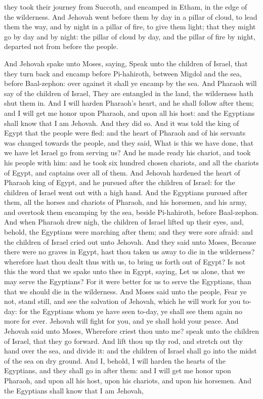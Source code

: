 they took their journey from Succoth, and encamped in Etham, in the edge of the wilderness. And Jehovah went before them by day in a pillar of cloud, to lead them the way, and by night in a pillar of fire, to give them light; that they might go by day and by night: the pillar of cloud by day, and the pillar of fire by night, departed not from before the people. 

And Jehovah spake unto Moses, saying, Speak unto the children of Israel, that they turn back and encamp before Pi-hahiroth, between Migdol and the sea, before Baal-zephon: over against it shall ye encamp by the sea. And Pharaoh will say of the children of Israel, They are entangled in the land, the wilderness hath shut them in. And I will harden Pharaoh’s heart, and he shall follow after them; and I will get me honor upon Pharaoh, and upon all his host: and the Egyptians shall know that I am Jehovah. And they did so. And it was told the king of Egypt that the people were fled: and the heart of Pharaoh and of his servants was changed towards the people, and they said, What is this we have done, that we have let Israel go from serving us? And he made ready his chariot, and took his people with him: and he took six hundred chosen chariots, and all the chariots of Egypt, and captains over all of them. And Jehovah hardened the heart of Pharaoh king of Egypt, and he pursued after the children of Israel: for the children of Israel went out with a high hand. And the Egyptians pursued after them, all the horses and chariots of Pharaoh, and his horsemen, and his army, and overtook them encamping by the sea, beside Pi-hahiroth, before Baal-zephon.  And when Pharaoh drew nigh, the children of Israel lifted up their eyes, and, behold, the Egyptians were marching after them; and they were sore afraid: and the children of Israel cried out unto Jehovah. And they said unto Moses, Because there were no graves in Egypt, hast thou taken us away to die in the wilderness? wherefore hast thou dealt thus with us, to bring us forth out of Egypt? Is not this the word that we spake unto thee in Egypt, saying, Let us alone, that we may serve the Egyptians? For it were better for us to serve the Egyptians, than that we should die in the wilderness. And Moses said unto the people, Fear ye not, stand still, and see the salvation of Jehovah, which he will work for you to-day: for the Egyptians whom ye have seen to-day, ye shall see them again no more for ever. Jehovah will fight for you, and ye shall hold your peace.  And Jehovah said unto Moses, Wherefore criest thou unto me? speak unto the children of Israel, that they go forward. And lift thou up thy rod, and stretch out thy hand over the sea, and divide it: and the children of Israel shall go into the midst of the sea on dry ground. And I, behold, I will harden the hearts of the Egyptians, and they shall go in after them: and I will get me honor upon Pharaoh, and upon all his host, upon his chariots, and upon his horsemen. And the Egyptians shall know that I am Jehovah, 